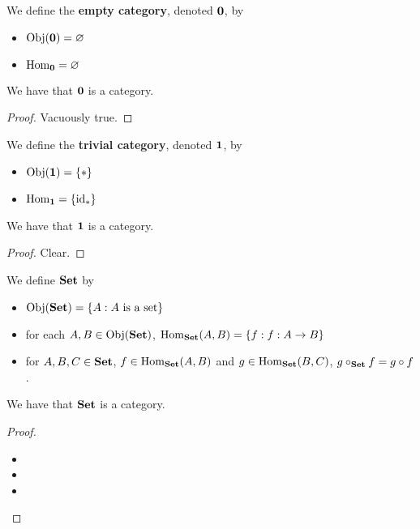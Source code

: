 \documentclass{book}
\begin{document}
	\begin{defn} 
		We define the \textbf{empty category}, denoted $\0$, by 
		\begin{itemize}
			\item $\Obj(\0) = \varnothing$
			\item $\Hom_{\0} = \varnothing$
		\end{itemize}
	\end{defn}

	\begin{ex} 
		We have that $\0$ is a category.
	\end{ex}
	
	\begin{proof}
		Vacuously true.
	\end{proof}

	\begin{defn} 
		We define the \textbf{trivial category}, denoted $\1$, by 
		\begin{itemize}
			\item $\Obj(\1) = \{*\}$
			\item $\Hom_{\1} = \{\id_*\}$
		\end{itemize}
	\end{defn}

	\begin{ex} 
		We have that $\1$ is a category.
	\end{ex}

	\begin{proof}
		Clear.
	\end{proof}
	
	\begin{defn} 
		We define $\Set$ by  
		\begin{itemize}
			\item $\Obj(\Set) = \{A: A \text{ is a set}\}$ 
			\item for each $A,B \in \Obj(\Set)$, $\Hom_{\Set}(A,B) = \{f: f:A \rightarrow B\}$
			\item for $A, B, C \in \Set$, $f \in \Hom_{\Set}(A, B)$ and $g \in \Hom_{\Set}(B, C)$, $g \circ_{\Set} f = g \circ f$. 
		\end{itemize}
	\end{defn}

	\begin{ex} 
		We have that $\Set$ is a category.
	\end{ex}

	\begin{proof}\
		\begin{itemize}
			\item {}
			\item {} 
			\item {} 
		\end{itemize}
	\end{proof}
	
\end{document}
